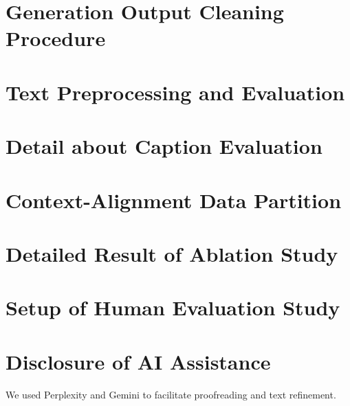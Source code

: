 \documentclass[11pt]{article}
\begin{document}
\section{Generation Output Cleaning Procedure\label{app:output-cleaning}}


\section{Text Preprocessing and Evaluation}\label{app:text-evaluation}



\section{Detail about Caption Evaluation\label{app:main-study-full}}


\section{Context-Alignment Data Partition\label{app:easy-hard}}



\section{Detailed Result of Ablation Study\label{app:ablation-study-detail}}


\section{Setup of Human Evaluation Study\label{app:human-eval}}


\section{Disclosure of AI Assistance\label{app:ai-assistance}}
We used Perplexity and Gemini to facilitate proofreading and text refinement.


\end{document}
